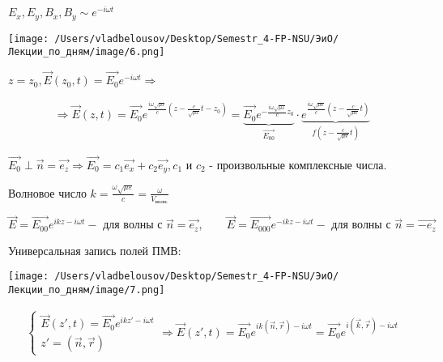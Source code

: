 \documentclass[12pt, a4paper]{report}
\begin{document}
\( E_x, E_y, B_x, B_y \sim e^{-i \omega t}   \) 

\text{ }

\begin{minipage}{0.5\textwidth}
    \texttt{[image: /Users/vladbelousov/Desktop/Semestr\_4-FP-NSU/ЭиО/Лекции\_по\_дням/image/6.png]}
\end{minipage}
\begin{minipage}{0.5\textwidth}
     \( z = z_0 , \vec{E}( z_0,t )= \vec{E_0}e^{-i \omega t} \Rightarrow  \) 
\end{minipage}

\begin{gather*}
    \displaystyle  \Rightarrow  \vec{E}( z,t)= \vec{E_0} e^{\frac{i \omega \sqrt{ \mu \varepsilon}}{c} \left( z- \frac{c}{\sqrt{\mu \varepsilon}} t -z_0  \right) }= \underbrace{\vec{E_0}e^{-\frac{i \omega \sqrt{ \mu \varepsilon}}{c}z_0} }_{\vec{E_{00}}} \cdot \underbrace{e^{\frac{i \omega \sqrt{ \mu \varepsilon}}{c} \left( z - \frac{c}{\sqrt{ \mu \varepsilon}}t  \right)} } _{f (z - \frac{c}{\sqrt{ \mu \varepsilon}}t)}   
\end{gather*}

\( \vec{E_0 } \perp \vec{n} = \vec{e_z} \Rightarrow \vec{E_0}=c_1 \vec{e_x}+ c_2 \vec{e_y}, c_1 \text{ и } c_2   \) - произвольные комплексные числа. 

\begin{definition}
    Волновое число \( k = \frac{\omega \sqrt{ \mu \varepsilon}}{c} = \frac{\omega}{V_{\text{волн.} } }   \) 
\end{definition}

\[ \displaystyle \vec{E}= \vec{E_{00}}e^{ikz- i \omega t } - \text{ для волны с } \vec{n} = \vec{e_z}, \qquad \vec{E}= \vec{E_{000}}e^{-ikz- i \omega t } - \text{ для волны с } \vec{n} = \vec{-e_z}  \] 

Универсальная запись полей ПМВ: 

\begin{center}
    \texttt{[image: /Users/vladbelousov/Desktop/Semestr\_4-FP-NSU/ЭиО/Лекции\_по\_дням/image/7.png]}
\end{center}

\[ \begin{aligned}
    \begin{cases}
        \displaystyle \vec{E}( z', t)= \vec{E_0 }e^{ikz' - i \omega t } \\  
        z'= (\vec{n}, \vec{r})
    \end{cases}
    \Rightarrow
    \displaystyle \vec{E}( z', t)= \vec{E_0}e^{ik(\vec{n}, \vec{r}) - i \omega t }= \vec{E_0}e^{i(\vec{k}, \vec{r}) - i \omega t }
\end{aligned} \] 

\ifdefined\mainfile
\else
    
\end{document}
